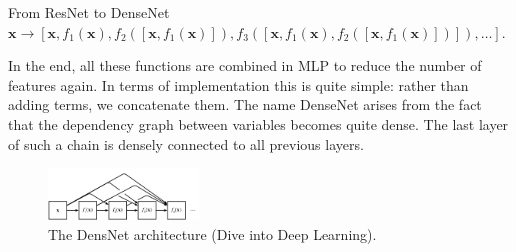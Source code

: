 \begin{vbframe}{From ResNet to DenseNet}
\vspace{0.2cm}
$\mathbf{x} \to \left[ \mathbf{x}, f_1(\mathbf{x}), f_2([\mathbf{x}, f_1(\mathbf{x})]), f_3([\mathbf{x}, f_1(\mathbf{x}), f_2([\mathbf{x}, f_1(\mathbf{x})])]), \ldots\right].$

\vspace{0.2cm}
\small
In the end, all these functions are combined in MLP to reduce the number of features again. In terms of implementation this is quite simple: rather than adding terms, we concatenate them. 
\newline
The name DenseNet arises from the fact that the dependency graph between variables becomes quite dense. The last layer of such a chain is densely connected to all previous layers. 

\vspace{-0.4cm}
  \begin{figure}
    \centering
    \includegraphics[width=4cm]{plots/moderncnn/densenet.png}
    \caption{The DensNet architecture (Dive into Deep Learning).}
  \end{figure}
  
 \end{vbframe}
